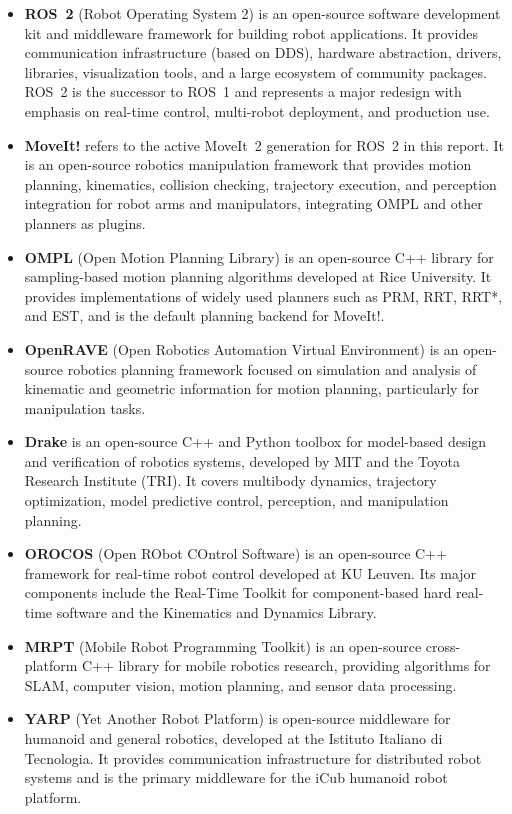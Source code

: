 \begin{itemize}
    \item \textbf{ROS~2} (Robot Operating System 2) is an open-source software development kit and middleware framework for building robot applications. It provides communication infrastructure (based on DDS), hardware abstraction, drivers, libraries, visualization tools, and a large ecosystem of community packages. ROS~2 is the successor to ROS~1 and represents a major redesign with emphasis on real-time control, multi-robot deployment, and production use.
    \item \textbf{MoveIt!} refers to the active MoveIt~2 generation for ROS~2 in this report. It is an open-source robotics manipulation framework that provides motion planning, kinematics, collision checking, trajectory execution, and perception integration for robot arms and manipulators, integrating OMPL and other planners as plugins.
    \item \textbf{OMPL} (Open Motion Planning Library) is an open-source C++ library for sampling-based motion planning algorithms developed at Rice University. It provides implementations of widely used planners such as PRM, RRT, RRT*, and EST, and is the default planning backend for MoveIt!.
    \item \textbf{OpenRAVE} (Open Robotics Automation Virtual Environment) is an open-source robotics planning framework focused on simulation and analysis of kinematic and geometric information for motion planning, particularly for manipulation tasks.
    \item \textbf{Drake} is an open-source C++ and Python toolbox for model-based design and verification of robotics systems, developed by MIT and the Toyota Research Institute (TRI). It covers multibody dynamics, trajectory optimization, model predictive control, perception, and manipulation planning.
    \item \textbf{OROCOS} (Open RObot COntrol Software) is an open-source C++ framework for real-time robot control developed at KU Leuven. Its major components include the Real-Time Toolkit for component-based hard real-time software and the Kinematics and Dynamics Library.
    \item \textbf{MRPT} (Mobile Robot Programming Toolkit) is an open-source cross-platform C++ library for mobile robotics research, providing algorithms for SLAM, computer vision, motion planning, and sensor data processing.
    \item \textbf{YARP} (Yet Another Robot Platform) is open-source middleware for humanoid and general robotics, developed at the Istituto Italiano di Tecnologia. It provides communication infrastructure for distributed robot systems and is the primary middleware for the iCub humanoid robot platform.

\end{itemize}
